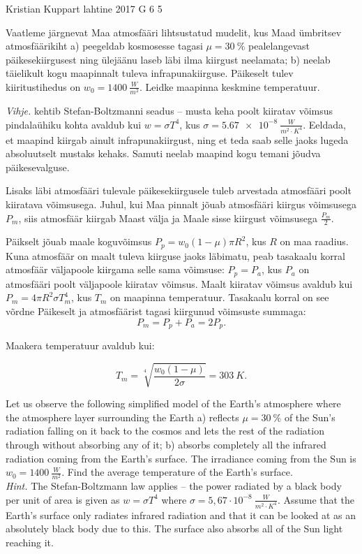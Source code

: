 {Kristian Kuppart} %
{lahtine} %
{2017} %
{G 6} %
{5} %
{
\ifStatement
Vaatleme järgnevat Maa atmosfääri lihtsustatud mudelit, kus Maad ümbritsev atmosfäärikiht a) peegeldab kosmosesse tagasi $\mu=\SI{30}{\%}$ pealelangevast päikesekiirgusest ning ülejäänu laseb läbi ilma kiirgust neelamata; b) neelab täielikult kogu maapinnalt tuleva infrapunakiirguse. Päikeselt tulev kiiritustihedus on $w_0=\SI{1400}{\frac{W}{m^2}}$. Leidke maapinna keskmine temperatuur.

\textit{Vihje.} kehtib Stefan-Boltzmanni seadus -- musta keha poolt kiiratav võimsus pindalaühiku kohta avaldub kui $w=\sigma T^4$, kus $\sigma=\SI{5.67e-8}{\frac{W}{m^2 \cdot K^4}}$. Eeldada, et maapind kiirgab ainult infrapunakiirgust, ning et teda saab selle jaoks lugeda absoluutselt mustaks kehaks. Samuti neelab maapind kogu temani jõudva päikesevalguse.
\fi


\ifHint
Lisaks läbi atmosfääri tulevale päikesekiirgusele tuleb arvestada atmosfääri poolt kiiratava võimsusega. Juhul, kui Maa pinnalt jõuab atmosfääri kiirgus võimsusega $P_m$, siis atmosfäär kiirgab Maast välja ja Maale sisse kiirgust võimsusega $\frac{P_m}{2}$.
\fi


\ifSolution
Päikselt jõuab maale koguvõimsus $P_p=w_0 \left(1-\mu\right)\pi R^2$, kus $R$ on maa raadius. Kuna atmosfäär on maalt tuleva kiirguse jaoks läbimatu, peab tasakaalu korral atmosfäär väljapoole kiirgama selle sama võimsuse: $P_p=P_a$, kus $P_a$ on atmosfääri poolt väljapoole kiiratav võimsus. Maalt kiiratav võimsus avaldub kui $P_m=4 \pi R^2 \sigma T_m^4$, kus $T_m$ on maapinna temperatuur. Tasakaalu korral on see võrdne Päikeselt ja atmosfäärist tagasi kiirgunud võimsuste summaga:
\[P_m=P_p+P_a=2P_p.\]

Maakera temperatuur avaldub kui:

\[T_m=\sqrt[4]{\frac{w_0\left(1-\mu\right)}{2\sigma}}=\SI{303}{K}.\]
\fi


\ifEngStatement
Let us observe the following simplified model of the Earth’s atmosphere where the atmosphere layer surrounding the Earth a) reflects $\mu=\SI{30}{\%}$ of the Sun’s radiation falling on it back to the cosmos and lets the rest of the radiation through without absorbing any of it; b) absorbs completely all the infrared radiation coming from the Earth’s surface. The irradiance coming from the Sun is $w_0=\SI{1400}{\frac{W}{m^2}}$. Find the average temperature of the Earth’s surface.\\
\emph{Hint.} The Stefan-Boltzmann law applies – the power radiated by a black body per unit of area is given as $w=\sigma T^4$ where $\sigma =5,67 \cdot 10^{-8} \SI{}{\frac{W}{m^2 \cdot K^4}}$. Assume that the Earth’s surface only radiates infrared radiation and that it can be looked at as an absolutely black body due to this. The surface also absorbs all of the Sun light reaching it.
\fi


}
